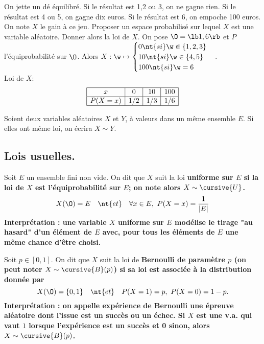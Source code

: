 \documentclass[11pt]{article}
\begin{document}
\begin{ex}{}{}
    On jette un dé équilibré. Si le résultat est 1,2 ou 3, on ne gagne rien. Si le résultat est 4 ou 5, on gagne dix euros. Si le résultat est 6, on empoche 100 euros.\\
    On note $X$ le gain à ce jeu. Proposer un espace probabilisé sur lequel $X$ est une variable aléatoire. Donner alors la loi de $X$.
    \tcblower
    On pose $\O=\lb1,6\rb$ et $P$ l'équiprobabilité sur $\O$. Alors $X:\w\mapsto\begin{cases}0 \nt{ si } \w\in\{1,2,3\}\\10\nt{ si } \w\in\{4,5\}\\100\nt{ si } \w=6\end{cases}$.\\
    Loi de $X$:
    \begin{eqnarray*}
        \begin{array}{|c|c|c|c|}
            \hline
            x & 0 & 10 & 100\\
            \hline
            P(X=x) & 1/2 & 1/3 & 1/6\\
            \hline
        \end{array}
    \end{eqnarray*}
\end{ex}

\begin{nota}{}{}
    Soient deux variables aléatoires $X$ et $Y$, à valeurs dans un même ensemble $E$. Si elles ont même loi, on écrira $X\sim Y$.
\end{nota}

\subsection{Lois usuelles.}

\begin{defi}{}{}
    Soit $E$ un ensemble fini non vide. On dit que $X$ suit la loi \bf{uniforme} sur $E$ si la loi de $X$ est l'équiprobabilité sur $E$; on note alors $X\sim\cursive{U}$.
    \begin{equation*}
        X(\O)=E \quad \nt{et} \quad \forall x\in E, ~ P(X=x) = \frac{1}{|E|}
    \end{equation*}
    Interprétation : une variable $X$ uniforme sur $E$ modélise le tirage "au hasard" d'un élément de $E$ avec, pour tous les éléments de $E$ une même chance d'être choisi.
\end{defi}

\begin{defi}{}{}
    Soit $p\in[0,1]$. On dit que $X$ suit la loi de \bf{Bernoulli} de paramètre $p$ (on peut noter $X\sim\cursive{B}(p)$) si sa loi est associée à la distribution donnée par
    \begin{equation*}
        X(\O)=\{0,1\} \quad \nt{et} \quad P(X=1)=p, ~ P(X=0)=1-p.
    \end{equation*} 
    Interprétation : on appelle expérience de Bernoulli une épreuve aléatoire dont l'issue est un succès ou un échec. Si $X$ est une v.a. qui vaut $1$ lorsque l'expérience est un succès et 0 sinon, alors $X\sim\cursive{B}(p)$.
\end{defi}
\end{document}
